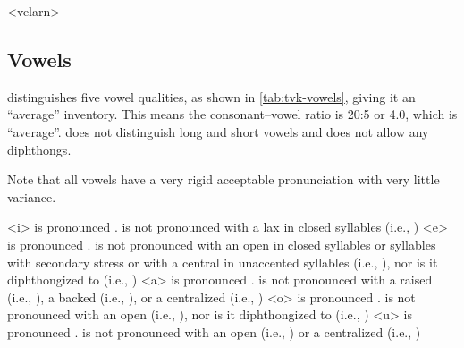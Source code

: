 \ex<velarn>
	   
\xe

\subsection{Vowels}
\label{subsec:tvk-vowels}


\langtvk{} distinguishes five vowel qualities, as shown in \autoref{tab:tvk-vowels}, giving it an \enquote{average} inventory.\autocite{wals-2} This means the consonant--vowel ratio is 20:5 or 4.0, which is \enquote{average}.\autocite{wals-3} \langtvk{} does not distinguish long and short vowels and does not allow any diphthongs.

Note that all \langtvk{} vowels have a very rigid acceptable pronunciation with very little variance.

	    is pronounced .  is not pronounced with a lax  in closed syllables (i.e., )
	    is pronounced .  is not pronounced with an open  in closed syllables or syllables with secondary stress or with a central  in unaccented syllables (i.e., ), nor is it diphthongized to  (i.e., )
	    is pronounced .  is not pronounced with a raised  (i.e., ), a backed  (i.e., ), or a centralized  (i.e., )
	    is pronounced .  is not pronounced with an open  (i.e., ), nor is it diphthongized to  (i.e., )
	    is pronounced .  is not pronounced with an open  (i.e., ) or a centralized  (i.e., )
\xe

